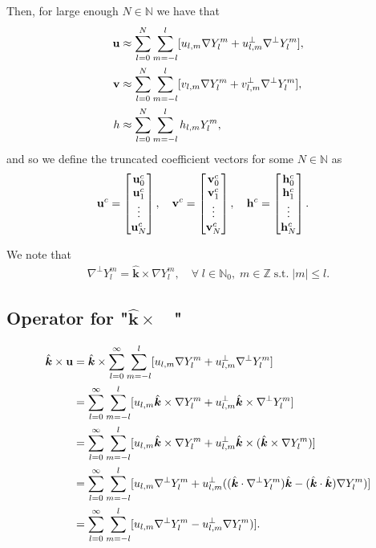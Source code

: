 \documentclass[11pt, oneside]{article}   	%
\newcommand{\Z}{\mathbb{Z}}
\newcommand{\N}{\mathbb{N}}
\newcommand{\No}{\mathbb{N}_0}
\newcommand{\Ylm}{Y^m_l}
\newcommand{\gradYlm}{\nabla Y^m_l}
\newcommand{\gradpYlm}{\nabla^\perp Y^m_l}
\newcommand{\unitvec}{\hat{\bm{k}}}
\begin{document}
Then, for large enough \(N \in \N\) we have that
\begin{align}
\bold{u} &\approx \sum_{l=0}^{N} \sum_{m=-l}^{l} [ u_{l,m} \gradYlm + u^{\perp}_{l,m} \gradpYlm ], \\
\bold{v} &\approx \sum_{l=0}^{N} \sum_{m=-l}^{l} [ v_{l,m} \gradYlm + v^{\perp}_{l,m} \gradpYlm ], \\
h &\approx \sum_{l=0}^{N} \sum_{m=-l}^{l} h_{l,m} \Ylm,
\end{align}
and so we define the truncated coefficient vectors for some \(N \in \N\) as
\begin{align}
\bold{u}^c &= \begin{bmatrix}
			\bold{u}_0^c \\
			\bold{u}_1^c \\
			\vdots \\
			\bold{u}_N^c
		    \end{bmatrix},
\quad
\bold{v}^c = \begin{bmatrix}
			\bold{v}_0^c \\
			\bold{v}_1^c \\
			\vdots \\
			\bold{v}_N^c
		    \end{bmatrix},
\quad
\bold{h}^c = \begin{bmatrix}
			\bold{h}_0^c \\
			\bold{h}_1^c \\
			\vdots \\
			\bold{h}_N^c
		    \end{bmatrix}.		  
\end{align}
			

We note that
\begin{align}
\gradpYlm = \unitvec \times \gradYlm, \quad \forall \; l \in \No, \; m \in \Z \; \text{s.t.} \; |m| \le l.
\end{align}

\subsection{Operator for "\(\unitvec \times \quad\)"}
\begin{align}
\unitvec \times \bold{u} &= \unitvec \times \sum_{l=0}^{\infty} \sum_{m=-l}^{l} [ u_{l,m} \gradYlm + u^{\perp}_{l,m} \gradpYlm ] \\
&= \sum_{l=0}^{\infty} \sum_{m=-l}^{l} [ u_{l,m} \unitvec \times \gradYlm + u^{\perp}_{l,m} \unitvec \times \gradpYlm ] \\
&= \sum_{l=0}^{\infty} \sum_{m=-l}^{l} [ u_{l,m} \unitvec \times \gradYlm + u^{\perp}_{l,m} \unitvec \times ( \unitvec \times \gradYlm ) ] \\
&= \sum_{l=0}^{\infty} \sum_{m=-l}^{l} [ u_{l,m} \gradpYlm + u^{\perp}_{l,m} (( \unitvec \cdot \gradpYlm) \unitvec - ( \unitvec \cdot \unitvec ) \gradYlm ) ] \\
&= \sum_{l=0}^{\infty} \sum_{m=-l}^{l} [ u_{l,m} \gradpYlm - u^{\perp}_{l,m} \gradYlm ) ]. \\
\end{align}
\end{document}
